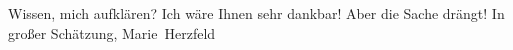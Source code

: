                Wissen, mich aufklären? Ich wäre Ihnen sehr dankbar! Aber die Sache drängt! In großer
               Schätzung,\pend
           \pstart \spacefill\mbox{Marie Herzfeld}\pend{}\endnumbering{}  \newcommand{\dateiname}{L02589}\newcommand{\titel}{Marie Herzfeld an Arthur Schnitzler, 5. 3. 1931}\newcommand{\editorInnen}{Martin Anton Müller und Laura Untner}
